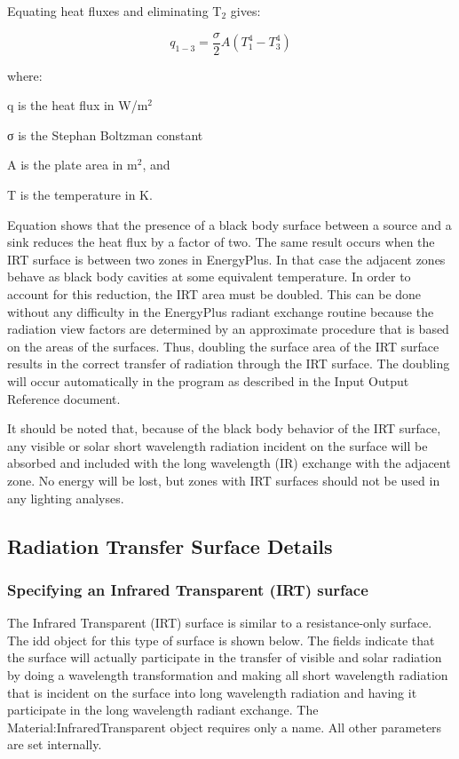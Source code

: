 Equating heat fluxes and eliminating T\(_{2}\) gives:

\begin{equation}
{q_{1 - 3}} = \frac{\sigma }{2}A\left( {T_1^4 - T_3^4} \right)
\end{equation}

where:

q is the heat flux in W/m\(^{2}\)

σ is the Stephan Boltzman constant

A is the plate area in m\(^{2}\), and

T is the temperature in K.

Equation shows that the presence of a black body surface between a source and a sink reduces the heat flux by a factor of two. The same result occurs when the IRT surface is between two zones in EnergyPlus. In that case the adjacent zones behave as black body cavities at some equivalent temperature. In order to account for this reduction, the IRT area must be doubled. This can be done without any difficulty in the EnergyPlus radiant exchange routine because the radiation view factors are determined by an approximate procedure that is based on the areas of the surfaces. Thus, doubling the surface area of the IRT surface results in the correct transfer of radiation through the IRT surface. The doubling will occur automatically in the program as described in the Input Output Reference document.

It should be noted that, because of the black body behavior of the IRT surface, any visible or solar short wavelength radiation incident on the surface will be absorbed and included with the long wavelength (IR) exchange with the adjacent zone. No energy will be lost, but zones with IRT surfaces should not be used in any lighting analyses.

\subsection{Radiation Transfer Surface Details}\label{radiation-transfer-surface-details}

\subsubsection{Specifying an Infrared Transparent (IRT) surface}\label{specifying-an-infrared-transparent-irt-surface}

The Infrared Transparent (IRT) surface is similar to a resistance-only surface. The idd object for this type of surface is shown below. The fields indicate that the surface will actually participate in the transfer of visible and solar radiation by doing a wavelength transformation and making all short wavelength radiation that is incident on the surface into long wavelength radiation and having it participate in the long wavelength radiant exchange. The Material:InfraredTransparent object requires only a name. All other parameters are set internally.

